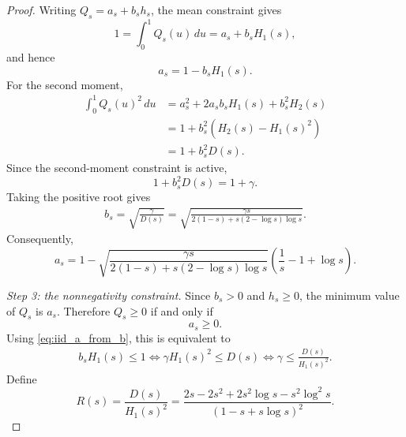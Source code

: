 \documentclass[10pt,a4paper]{amsart}
\newcommand{\comp}{\gamma}
\begin{document}
\begin{proof}
Writing $Q_s=a_s+b_sh_s$, the mean constraint gives
\begin{equation*}
    1
    =
    \int_0^1Q_s(u)\,du
    =
    a_s+b_sH_1(s),
\end{equation*}
and hence
\begin{equation}\label{eq:iid_a_from_b}
    a_s=1-b_sH_1(s).
\end{equation}
For the second moment,
\begin{align*}
    \int_0^1Q_s(u)^2\,du
    &=
    a_s^2+2a_sb_sH_1(s)+b_s^2H_2(s)\\
    &=
    1+b_s^2\left(H_2(s)-H_1(s)^2\right)\\
    &=
    1+b_s^2D(s).
\end{align*}
Since the second-moment constraint is active,
\begin{equation*}
    1+b_s^2D(s)=1+\comp.
\end{equation*}
Taking the positive root gives
\begin{align}
    b_s
    =
    \sqrt{\frac{\comp}{D(s)}}
    =
    \sqrt{
        \frac{\comp s}{
            2(1-s)+s(2-\log s)\log s
        }
    }.
    \label{eq:iid_b}
\end{align}
Consequently,
\begin{equation}\label{eq:iid_a}
    a_s
    =
    1-
    \sqrt{
        \frac{\comp s}{
            2(1-s)+s(2-\log s)\log s
        }
    }
    \left(
        \frac1s-1+\log s
    \right).
\end{equation}

\medskip

\noindent\emph{Step 3: the nonnegativity constraint.}
Since $b_s>0$ and $h_s\geq0$, the minimum value of $Q_s$ is $a_s$.
Therefore $Q_s\geq0$ if and only if
\begin{equation*}
    a_s\geq0.
\end{equation*}
Using \eqref{eq:iid_a_from_b}, this is equivalent to
\begin{align*}
    b_sH_1(s)\leq1
    \iff
    \comp H_1(s)^2\leq D(s)
    \iff
    \comp
    \leq
    \frac{D(s)}{H_1(s)^2}.
\end{align*}
Define
\begin{equation}\label{eq:iid_feasibility_ratio}
    R(s)
    =
    \frac{D(s)}{H_1(s)^2}
    =
    \frac{
        2s-2s^2+2s^2\log s-s^2\log^2s
    }{
        \left(1-s+s\log s\right)^2
    }.
\end{equation}


\end{proof}
\end{document}
